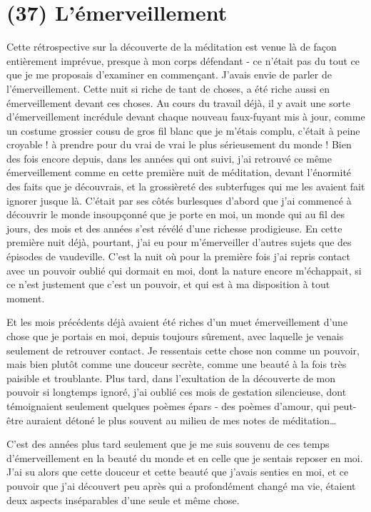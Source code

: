 \section{(37) L'émerveillement}

Cette rétrospective sur la découverte de la méditation est venue là de façon entièrement imprévue, presque à mon corps défendant - ce n'était pas du tout ce que je me proposais d'examiner en commençant. J'avais envie de parler de l'émerveillement. Cette nuit si riche de tant de choses, a été riche aussi en émerveillement devant ces choses. Au cours du travail déjà, il y avait une sorte d'émerveillement incrédule devant chaque nouveau faux-fuyant mis à jour, comme un costume grossier cousu de gros fil blanc que je m'étais complu, c'était à peine croyable ! à prendre pour du vrai de vrai le plus sérieusement du monde ! Bien des fois encore depuis, dans les années qui ont suivi, j'ai retrouvé ce même émerveillement comme en cette première nuit de méditation, devant l'énormité des faits que je découvrais, et la grossièreté des subterfuges qui me les avaient fait ignorer jusque là. C'était par ses côtés burlesques d'abord que j'ai commencé à découvrir le monde insoupçonné que je porte en moi, un monde qui au fil des jours, des mois et des années s'est révélé d'une richesse prodigieuse. En cette première nuit déjà, pourtant, j'ai eu pour m'émerveiller d'autres sujets que des épisodes de vaudeville. C'est la nuit où pour la première fois j'ai repris contact avec un pouvoir oublié qui dormait en moi, dont la nature encore m'échappait, si ce n'est justement que c'est un pouvoir, et qui est à ma disposition à tout moment.

Et les mois précédents déjà avaient été riches d'un muet émerveillement d'une chose que je portais en moi, depuis toujours sûrement, avec laquelle je venais seulement de retrouver contact. Je ressentais cette chose non comme un pouvoir, mais bien plutôt comme une douceur secrète, comme une beauté à la fois très paisible et troublante. Plus tard, dans l'exultation de la découverte de mon pouvoir si longtemps ignoré, j'ai oublié ces mois de gestation silencieuse, dont témoignaient seulement quelques poèmes épars - des poèmes d'amour, qui peut-être auraient détoné le plus souvent au milieu de mes notes de méditation\ldots

C'est des années plus tard seulement que je me suis souvenu de ces temps d'émerveillement en la beauté du monde et en celle que je sentais reposer en moi. J'ai su alors que cette douceur et cette beauté que j'avais senties en moi, et ce pouvoir que j'ai découvert peu après qui a profondément changé ma vie, étaient deux aspects inséparables d'une seule et même chose.

